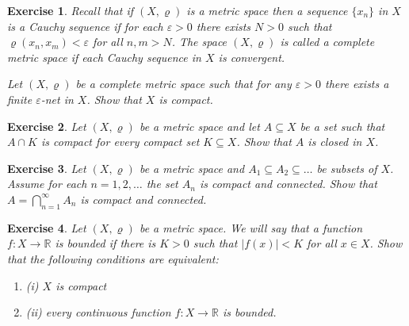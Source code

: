 \documentclass[11pt, letterpaper, oneside]{report}
\theoremstyle{pplain}
\newtheorem{ITERMVALUE THM}[theorem]{Intermediate Value Theorem}
\newtheorem{HEINEBOREL THM}[theorem]{Heine-Borel Theorem}
\newtheorem{UMETR THM}[theorem]{Urysohn Metrization Theorem}
\newtheorem{UMETR2 THM}[theorem]{Urysohn Metrization Theorem (v.2)}
\theoremstyle{ddefinition}
\theoremstyle{nnn}
\newtheorem{TDA NN}[theorem]{Topological Data Analysis. }
\theoremstyle{eexercise}
\newtheorem{exercise}{Exercise}[chapter]
\newcommand{\R}{{\mathbb R}}
\newcommand{\benu}{\begin{enumerate}}
\newcommand{\eenu}{\end{enumerate}}
\begin{document}
\begin{exercise}
Recall that if $(X, \varrho)$ is a metric space then a sequence $\{x_{n}\}$ in $X$ is a Cauchy sequence
if for each $\varepsilon > 0$ there exists $N > 0$ such that $\varrho(x_{n}, x_{m}) < \varepsilon$
for all $n, m > N$. The space $(X, \varrho)$ is called a \emph{complete metric space} 
if each Cauchy sequence in $X$ is convergent.  

Let $(X, \varrho)$ be a complete metric space such that for any $\varepsilon >0$ there exists 
a finite $\varepsilon$-net in $X$.  Show that $X$ is compact. 
\end{exercise}







\begin{exercise}
Let $(X, \varrho)$ be a metric space and let $A\subseteq X$  be a set such that $A\cap K$ is compact
for every compact set $K\subseteq X$. Show that $A$ is closed in $X$. 
\end{exercise}




\begin{exercise}
Let $(X, \varrho)$ be a metric space and $A_{1}\subseteq A_{2} \subseteq \dots$ be subsets of $X$. 
Assume for each $n=1, 2, \dots$ the set  $A_{n}$ is compact and connected. Show that 
$A = \bigcap_{n=1}^{\infty} A_{n}$ is compact and connected.  

\end{exercise}





\begin{exercise}
Let $(X, \varrho)$ be a metric space. We will say that a function $f\colon X\to \R$ is \emph{bounded}
if there is $K > 0$ such that $|f(x)| < K$ for all $x\in X$. Show that the following conditions are equivalent:
\benu
\item[(i)] $X$ is compact 
\item[(ii)] every continuous function $f\colon X \to \R$ is bounded.
\eenu
\end{exercise}
\end{document}

